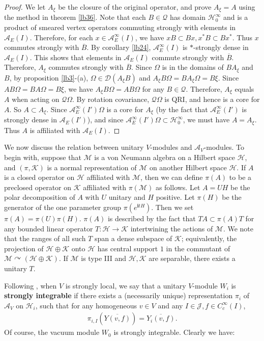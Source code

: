 \documentclass[12pt,a4paper]{article}
\theoremstyle{definition}
\theoremstyle{plain}
\newcommand{\mc}{\mathcal}
\newcommand{\ovl}{\overline}
\newcommand{\Dom}{\scr D}
\newcommand{\scr}{\mathscr}
\newcommand{\im}{\mathbf{i}}
\numberwithin{equation}{subsection}
\begin{document}
\begin{proof}
We let $A_\xi$ be the closure of the original operator, and prove $A_\xi=A$ using the method in theorem \ref{lb36}. Note that each $B\in\mc Q$ has domain $\mc H_0^\infty$ and is a product of smeared vertex operators commuting strongly with elements in $\mc A_E(I)$. Therefore, for each $x\in\mc A_E^\infty(I)$, we have $xB\subset Bx,x^*B\subset Bx^*$. Thus $x$ commutes strongly with $\ovl B$. By corollary \ref{lb24}, $\mc A_E^\infty(I)$ is $*$-strongly dense in $\mc A_E(I)$. This shows that elements in $\mc A_E(I)$ commute strongly with $\ovl B$. Therefore,  $A_\xi$ commutes strongly with $\ovl B$. Since $\Omega$ is in the domains of $BA_\xi$ and $B$, by proposition \ref{lb3}-(a), $\Omega\in\Dom(A_\xi B)$ and $A_\xi B\Omega=BA_\xi\Omega=B\xi$. Since $AB\Omega=BA\Omega=B\xi$, we have $A_\xi B\Omega=AB\Omega$ for any $B\in\mc Q$. Therefore,  $A_\xi$ equals $A$ when acting on $\mc Q\Omega$. By rotation covariance, $\mc Q\Omega$ is QRI, and hence is a core for $A$. So $A\subset A_\xi$. Since $\mc A_E^\infty(I')\Omega$ is a core for $A_\xi$ (by the fact that $\mc A_E^\infty(I')$ is strongly dense in $\mc A_E(I')$), and since $\mc A_E^\infty(I')\Omega\subset\mc H_0^\infty$, we must have $A=A_\xi$. Thus $A$ is affiliated with $\mc A_E(I)$.
\end{proof}






We now discuss the relation between unitary $V$-modules and $\mc A_V$-modules. To begin with, suppose that $\mc M$ is a von Neumann algebra on a Hilbert space $\mc H$, and $(\pi,\mc K)$ is a normal representation of $\mc M$ on another Hilbert space $\mc H$. If $A$ is a closed operator on $\mc H$ affiliated with $\mc M$, then we can define $\pi(A)$ to be a preclosed operator on $\mc K$ affiliated with $\pi(\mc M)$ as follows. Let $A=UH$ be the polar decomposition of $A$ with $U$ unitary and $H$ positive. Let $\pi(H)$ be the generator of the one parameter group $\pi(e^{\im t H})$. Then we set $\pi(A)=\pi(U)\pi(H)$. $\pi(A)$ is described by the fact that $TA\subset\pi(A)T$ for any bounded linear operator $T:\mc H\rightarrow\mc K$ intertwining the actions of $\mc M$. We note that the ranges of all such $T$ span a dense subspace of $\mc K$; equivalently, the projection of $\mc H\oplus\mc K$ onto $\mc H$ has central support $1$ in the commutant of $\mc M\curvearrowright(\mc H\oplus\mc K)$. If $\mc M$ is type III and $\mc H,\mc K$ are separable, there exists a unitary $T$.

Following \cite{CWX}, when $V$ is strongly local, we say that a unitary $V$-module $W_i$ is \textbf{strongly integrable} if there exists a (necessarily unique) representation $\pi_i$ of $\mc A_V$ on $\mc H_i$, such that for any homogeneous $v\in V$ and any $I\in\mc J,f\in C_c^\infty(I)$,
\begin{align}
\pi_{i,I}(\ovl{Y(v,f)})=\ovl{Y_i(v,f)}.\label{eq36}
\end{align}
Of course, the vacuum module $W_0$ is strongly integrable. Clearly we have:
\end{document}
